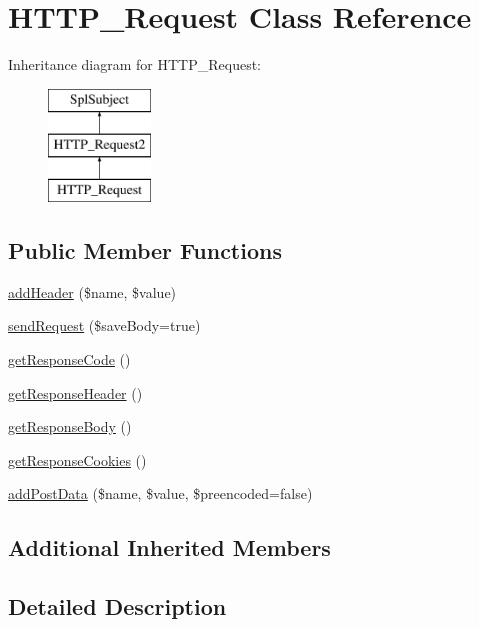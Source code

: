 \hypertarget{classHTTP__Request}{\section{H\-T\-T\-P\-\_\-\-Request Class Reference}
\label{classHTTP__Request}
}
Inheritance diagram for H\-T\-T\-P\-\_\-\-Request\-:\begin{figure}[H]
\begin{center}
\leavevmode
\includegraphics[height=3.000000cm]{classHTTP__Request}
\end{center}
\end{figure}
\subsection*{Public Member Functions}
\begin{DoxyCompactItemize}
\item 
\hyperlink{classHTTP__Request_ad7ce4b414109089320151442d1aa23d3}{add\-Header} (\$name, \$value)
\item 
\hyperlink{classHTTP__Request_af3e8b1423f6a2858652063c4a6f697a0}{send\-Request} (\$save\-Body=true)
\item 
\hyperlink{classHTTP__Request_adca0e2580505791e5ad42f7737568ade}{get\-Response\-Code} ()
\item 
\hyperlink{classHTTP__Request_a821d6c29dea6073a0d7f5e414d1237a6}{get\-Response\-Header} ()
\item 
\hyperlink{classHTTP__Request_a8cf9237fc5a74cc2d797b64b7823db08}{get\-Response\-Body} ()
\item 
\hyperlink{classHTTP__Request_a5fc2cc22a0652620d6866994397f5418}{get\-Response\-Cookies} ()
\item 
\hyperlink{classHTTP__Request_a3b856946e8c0ccc2c84dac7c7e93bd9d}{add\-Post\-Data} (\$name, \$value, \$preencoded=false)
\end{DoxyCompactItemize}
\subsection*{Additional Inherited Members}


\subsection{Detailed Description}


